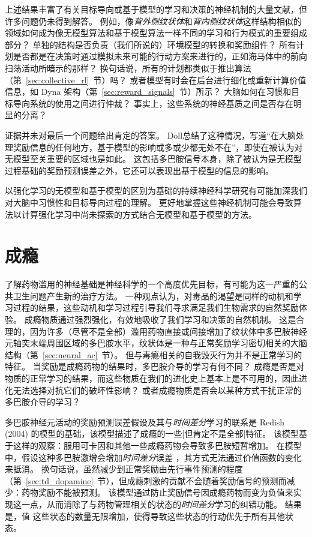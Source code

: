 上述结果丰富了有关目标导向或基于模型的学习和决策的神经机制的大量文献，但许多问题仍未得到解答。
例如，像\textit{背外侧纹状体}和\textit{背内侧纹状体}这样结构相似的领域如何成为像无模型算法和基于模型算法一样不同的学习和行为模式的重要组成部分？
单独的结构是否负责（我们所说的）环境模型的转换和奖励组件？
所有计划是否都是在决策时通过模拟未来可能的行动方案来进行的，正如海马体中的前向扫荡活动所暗示的那样？
换句话说，所有的计划都类似于推出算法（第~\ref{sec:collective_rl}~节）吗？
或者模型有时会在后台进行细化或重新计算价值信息，如 Dyna 架构（第~\ref{sec:reward_signals}~节）所示？
大脑如何在习惯和目标导向系统的使用之间进行仲裁？
事实上，这些系统的神经基质之间是否存在明显的分离？


证据并未对最后一个问题给出肯定的答案。
Doll\cite{doll2012ubiquity}总结了这种情况，写道“在大脑处理奖励信息的任何地方，基于模型的影响或多或少都无处不在”，即使在被认为对无模型至关重要的区域也是如此。
这包括多巴胺信号本身，除了被认为是无模型过程基础的奖励预测误差之外，它还可以表现出基于模型的信息的影响。


以强化学习的无模型和基于模型的区别为基础的持续神经科学研究有可能加深我们对大脑中习惯性和目标导向过程的理解。
更好地掌握这些神经机制可能会导致算法以计算强化学习中尚未探索的方式结合无模型和基于模型的方法。


\section{成瘾}


了解药物滥用的神经基础是神经科学的一个高度优先目标，有可能为这一严重的公共卫生问题产生新的治疗方法。
一种观点认为，对毒品的渴望是同样的动机和学习过程的结果，这些动机和学习过程引导我们寻求满足我们生物需求的自然奖励体验。
成瘾物质通过强烈强化，有效地吸收了我们学习和决策的自然机制。
这是合理的，因为许多（尽管不是全部）滥用药物直接或间接增加了纹状体中多巴胺神经元轴突末端周围区域的多巴胺水平，纹状体是一种与正常奖励学习密切相关的大脑结构（第~\ref{sec:neural_ac}~节）。
但与毒瘾相关的自我毁灭行为并不是正常学习的特征。
当奖励是成瘾药物的结果时，多巴胺介导的学习有何不同？
成瘾是否是对物质的正常学习的结果，而这些物质在我们的进化史上基本上是不可用的，因此进化无法选择对抗它们的破坏性影响？
或者成瘾物质是否会以某种方式干扰正常的多巴胺介导的学习？


多巴胺神经元活动的奖励预测误差假设及其与\textit{时间差分}学习的联系是 Redish (2004) 的模型的基础，该模型描述了成瘾的一些|但肯定不是全部|特征。
该模型基于这样的观察：服用可卡因和其他一些成瘾药物会导致多巴胺短暂增加。
在模型中，假设这种多巴胺激增会增加\textit{时间差分}误差 ，其方式无法通过价值函数的变化来抵消。
换句话说，虽然减少到正常奖励由先行事件预测的程度（第~\ref{sec:td_dopamine}~节），但成瘾刺激的贡献不会随着奖励信号的预测而减少：药物奖励不能被预测。
该模型通过防止奖励信号因成瘾药物而变为负值来实现这一点，从而消除了与药物管理相关的状态的\textit{时间差分}学习的纠错功能。
结果是，值 这些状态的数量无限增加，使得导致这些状态的行动优先于所有其他状态。


